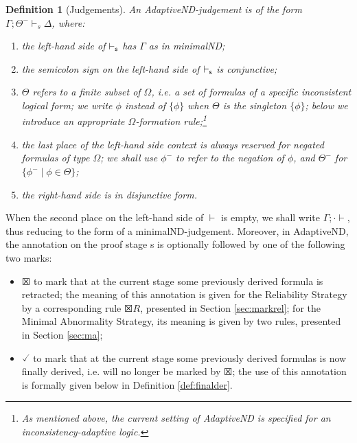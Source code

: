 \documentclass[]{article}
\newtheorem{definition}{Definition}
\begin{document}
\begin{definition}[Judgements]
An {\sf AdaptiveND}-judgement is of the form $\Gamma; \Theta^{-}\vdash_{s} \Delta$, where:

\begin{enumerate}
\item the left-hand side of $\vdash_{\sf s}$ has $\Gamma$ as in {\sf minimalND};
\item the semicolon sign on the left-hand side of $\vdash_{\sf s}$ is conjunctive;
\item $\Theta$ refers to a finite subset of $\Omega$, i.e. a set of formulas of a specific inconsistent logical form; we write $\phi$ instead of $\{\phi\}$ when $\Theta$ is the singleton $\{\phi\}$; below we introduce an appropriate $\Omega$-formation rule;\footnote{As mentioned above, the current setting of {\sf AdaptiveND} is specified for an inconsistency-adaptive logic.}
\item the last place of the left-hand side context is always reserved for negated formulas of type $\Omega$; we shall use $\phi^{-}$ to refer to the negation of $\phi$, and $\Theta^-$ for $\{\phi^- \mid \phi \in \Theta\}$;
\item the right-hand side is in disjunctive form.
\end{enumerate}
\end{definition}
%
When the second place on the left-hand side of $\vdash$ is empty, we shall write $\Gamma;\cdot\vdash$, thus reducing to the form of a {\sf minimalND}-judgement.
Moreover, in {\sf AdaptiveND}, the annotation on the proof stage {\sf s} is optionally followed by one of the following two marks:

\begin{itemize}
    \item[]  $\XBox$ to mark that at the current stage some previously derived formula is retracted; the meaning of this annotation is given for the Reliability Strategy by a corresponding rule $\XBox R$, presented in Section \ref{sec:markrel}; for the Minimal Abnormality Strategy, its meaning is given by two rules, presented in Section \ref{sec:ma};
\item[] $\checked$ to mark that at the current stage some previously derived formulas is now finally derived, i.e. will no longer be marked by $\XBox$; the use of this annotation is formally given below in Definition \ref{def:finalder}.
\end{itemize}
\end{document}
